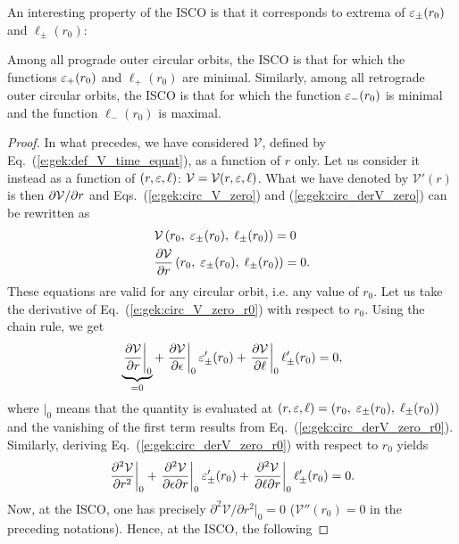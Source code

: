 An interesting property of the ISCO is that it corresponds to extrema of
$\varepsilon_\pm(r_0)$ and $\ell_\pm(r_0)$:
\begin{prop}
\label{p:gek:ISCO_extremum_eps_ell}
Among all prograde outer circular orbits, the ISCO is that for which
the functions $\varepsilon_+(r_0)$ and $\ell_+(r_0)$ are minimal.
Similarly, among all retrograde outer circular orbits, the ISCO is that for
which the function $\varepsilon_-(r_0)$ is minimal and the function $\ell_-(r_0)$
is maximal.
\end{prop}
\begin{proof}
In what precedes, we have considered $\mathcal{V}$, defined by
Eq.~(\ref{e:gek:def_V_time_equat}), as a function of $r$ only. Let us consider
it instead as a function of $(r, \varepsilon, \ell)$: $\mathcal{V} = \mathcal{V}(r, \varepsilon, \ell)$.
What we have denoted by
$\mathcal{V}'(r)$ is then ${\partial \mathcal{V}}/{\partial r}$ and
Eqs.~(\ref{e:gek:circ_V_zero}) and (\ref{e:gek:circ_derV_zero}) can be rewritten
as
\begin{subequations}
\begin{align}
& \mathcal{V}\left(r_0,\; \varepsilon_\pm(r_0),\; \ell_\pm(r_0)\right) = 0 \label{e:gek:circ_V_zero_r0} \\
& \frac{\partial \mathcal{V}}{\partial r} \left(r_0,\; \varepsilon_\pm(r_0),\; \ell_\pm(r_0)\right) = 0 .
    \label{e:gek:circ_derV_zero_r0}
\end{align}
\end{subequations}
These equations are valid for any circular orbit, i.e. any value of $r_0$.
Let us take the derivative of Eq.~(\ref{e:gek:circ_V_zero_r0}) with respect to $r_0$.
Using the chain rule, we get
\[
    \underbrace{\left. \frac{\partial \mathcal{V}}{\partial r} \right| _0}_{=0}
    + \left. \frac{\partial \mathcal{V}}{\partial \epsilon} \right| _0  \varepsilon_\pm'(r_0)
    + \left. \frac{\partial \mathcal{V}}{\partial \ell} \right| _0  \ell_\pm'(r_0) = 0 ,
\]
where $| _0$ means that the quantity is evaluated at $(r,\varepsilon,\ell)=\left(r_0,\; \varepsilon_\pm(r_0),\; \ell_\pm(r_0)\right)$ and the vanishing of the first term results from Eq.~(\ref{e:gek:circ_derV_zero_r0}).
Similarly, deriving Eq.~(\ref{e:gek:circ_derV_zero_r0}) with respect to $r_0$ yields
\[
    \left. \frac{\partial^2\mathcal{V}}{\partial r^2} \right| _0
    + \left. \frac{\partial^2\mathcal{V}}{\partial\epsilon\partial r} \right| _0  \varepsilon_\pm'(r_0)
    + \left. \frac{\partial^2\mathcal{V}}{\partial\ell\partial r} \right| _0  \ell_\pm'(r_0)
    = 0 .
\]
Now, at the ISCO, one has precisely ${\partial^2\mathcal{V}}/{\partial r^2} |_0 = 0$
($\mathcal{V}''(r_0) = 0$ in the preceding notations). Hence, at the ISCO, the following

\end{proof}
